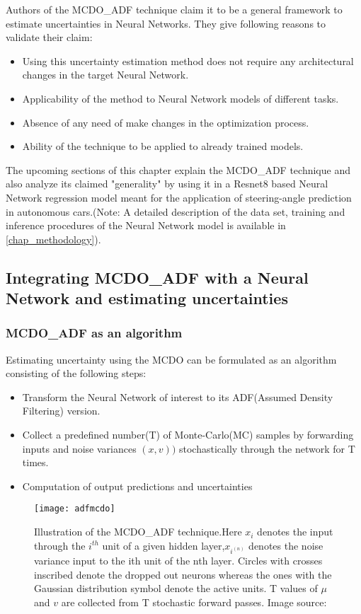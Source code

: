 	Authors of the MCDO\_ADF technique claim it to be a general framework to estimate uncertainties in Neural Networks. They give following reasons to validate their claim:
	\begin{itemize}
		\item Using this uncertainty estimation method does not require any architectural changes in the target Neural Network.
		\item Applicability of the method to Neural Network models of different tasks.
		\item Absence of any need of make changes in the optimization process.
		\item Ability of the technique to be applied to already trained models.
	\end{itemize}
	
	The upcoming sections of this chapter explain the MCDO\_ADF technique  and also analyze its claimed "generality" by using it in a Resnet8 based Neural Network regression model meant for the application of steering-angle prediction in autonomous cars.(Note: A detailed description of the data set, training and inference procedures of the Neural Network model is available in \ref{chap_methodology}).  
	
	
	\subsection{Integrating MCDO\_ADF with a Neural Network and estimating uncertainties}
	\subsubsection{MCDO\_ADF as an algorithm}
	Estimating uncertainty using the MCDO can be formulated as an algorithm consisting of the following steps:
	\begin{itemize}
		\item Transform the Neural Network of interest to its ADF(Assumed Density Filtering) version.
		\item Collect a predefined number(T) of Monte-Carlo(MC) samples by forwarding inputs and noise variances $(x,v))$ stochastically through the network for T times.
		\item Computation of output predictions and uncertainties  
	\end{itemize}
	\begin{figure}[h]
		\texttt{[image: adfmcdo]}
		\caption{Illustration of the MCDO\_ADF technique.Here $x_{i}$ denotes the input through the $i^{th}$ unit of a given hidden layer,$x_{i^{(n)}}$ denotes the noise variance input to the ith unit of the nth layer. Circles with crosses inscribed denote the dropped out neurons whereas the ones with the Gaussian distribution symbol denote the active units. T values of $\mu$ and $v$ are collected from T stochastic forward passes. Image source: }
		\label{fig_adf_mcdo}
	\end{figure}
	

